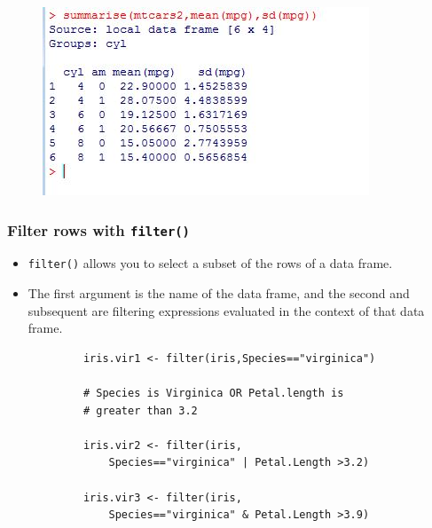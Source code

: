 \documentclass{beamer}
\begin{document}
	\begin{frame}
		\begin{figure}
			\centering
			\includegraphics[width=0.9\linewidth]{images/mtcarssummarise}
			\label{fig:mtcarssummarise}
		\end{figure}
	\end{frame}
	
	
	\begin{frame}
		\frametitle{Filter rows with \texttt{filter()}}
		\Large
		\vspace{-1.5cm}
		\begin{itemize}
			\item \texttt{filter()} allows you to select a subset of the rows of a data frame. 
			\item The first argument is the name of the data frame, and the second and subsequent are filtering expressions evaluated in the context of that data frame.
		\end{itemize}
		
		
		
	\end{frame}
	\begin{frame}[fragile]	
		\begin{framed}
			\begin{verbatim}
			iris.vir1 <- filter(iris,Species=="virginica")
			
			# Species is Virginica OR Petal.length is 
			# greater than 3.2
			
			iris.vir2 <- filter(iris,
			    Species=="virginica" | Petal.Length >3.2)
			
			iris.vir3 <- filter(iris,
			    Species=="virginica" & Petal.Length >3.9)
			
			\end{verbatim}
		\end{framed}
	\end{frame}
	
\end{document}
